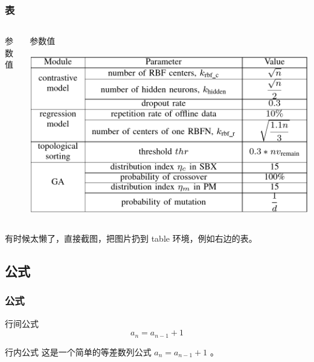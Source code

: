 \documentclass[
    10pt,
    pdf,
    UTF8,
    aspectratio=169
]{ctexbeamer}
\begin{document}
\begin{frame}
    \frametitle{表}
    \begin{columns}
        \begin{column}{0.3\textwidth}
            \begin{table}
                \centering
                \caption{参数值}
                \label{tb:paramter}
                
            \end{table}
        \end{column}
        \begin{column}{0.7\textwidth}
            \begin{table}
                \centering
                \caption{参数值}
                \label{tb:figure}
                \includegraphics[width=1\textwidth]{./table/figure.png}
            \end{table}
        \end{column}
    \end{columns}
    \hspace{2em} 有时候太懒了，直接截图，把图片扔到 table 环境，例如右边的表。
\end{frame}

\subsection{公式}
\begin{frame}
    \frametitle{公式}
    \begin{block}{行间公式}
        \begin{equation}
            \label{eq:example}
            a_n = a_{n-1} + 1
        \end{equation}
    \end{block}
    \begin{block}{行内公式}
        这是一个简单的等差数列公式 $a_n = a_{n-1} + 1$ 。
    \end{block}
\end{frame}
\end{document}
